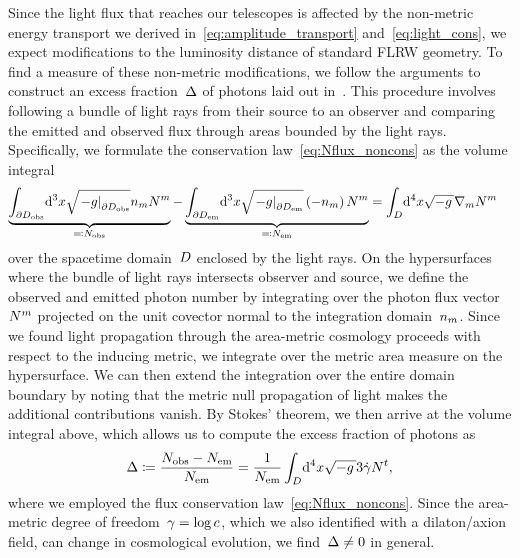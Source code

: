 Since the light flux that reaches our telescopes is affected by the non-metric energy transport we derived in~\eqref{eq:amplitude_transport} and~\eqref{eq:light_cons}, we expect modifications to the luminosity distance of standard FLRW geometry. To find a measure of these non-metric modifications, we follow the arguments to construct an excess fraction~$\Delta$ of photons laid out in~\autocite{EtheringtonBiref}. This procedure involves following a bundle of light rays from their source to an observer and comparing the emitted and observed flux through areas bounded by the light rays. Specifically, we formulate the conservation law~\eqref{eq:Nflux_noncons} as the volume integral
\begin{align}
	\underbrace{\int_{\partial\domain_\obs}\!\dif{^3\coordx}\sqrt{\left.-\met\right|_{\partial\domain_\obs}}\areanorm_m\Nflux^m}_{\eqdef\Nflux_\obs}-
	\underbrace{\int_{\partial\domain_\src}\!\dif{^3\coordx}\sqrt{\left.-\met\right|_{\partial\domain_\src}}\left(-\areanorm_m\right)\Nflux^m}_{\eqdef\Nflux_\src}
	&=\int_{\domain}\!\dif{^4\coordx}\sqrtmet\covd_m\Nflux^m
\end{align}
over the spacetime domain~$D$ enclosed by the light rays. On the hypersurfaces where the bundle of light rays intersects observer and source, we define the observed and emitted photon number by integrating over the photon flux vector~$N^m$ projected on the unit covector normal to the integration domain~$n_m$. Since we found light propagation through the area-metric cosmology proceeds with respect to the inducing \FLRW{} metric, we integrate over the metric area measure on the hypersurface. We can then extend the integration over the entire domain boundary by noting that the metric null propagation of light makes the additional contributions vanish. By Stokes' theorem, we then arrive at the volume integral above, which allows us to compute the excess fraction of photons as
\begin{equation}
	\Dflux\defeq\frac{\Nflux_\obs-\Nflux_\src}{\Nflux_\src}=\frac{1}{\Nflux_\src}\int_{\domain}\!\dif{^4\coordx}\sqrtmet 3\dt{\lnc}\Nflux^t
	\eqpunct{,}
\end{equation}
where we employed the flux conservation law~\eqref{eq:Nflux_noncons}. Since the area-metric degree of freedom~$\gamma=\log c$, which we also identified with a dilaton/axion field, can change in cosmological evolution, we find~$\Delta\neq 0$ in general.

